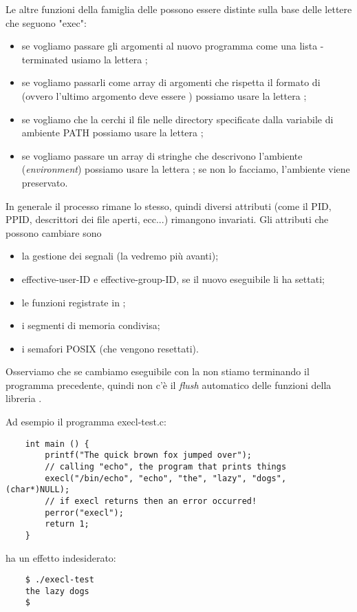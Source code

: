 Le altre funzioni della famiglia delle  possono essere distinte sulla base delle lettere che seguono "exec":
\begin{itemize}
    \item se vogliamo passare gli argomenti al nuovo programma come una lista -terminated usiamo la lettera ;
    \item se vogliamo passarli come array di argomenti che rispetta il formato di  (ovvero l'ultimo argomento deve essere ) possiamo usare la lettera ;
    \item se vogliamo che la  cerchi il file nelle directory specificate dalla variabile di ambiente \textsf{PATH} possiamo usare la lettera ;
    \item se vogliamo passare un array di stringhe che descrivono l'ambiente (\emph{environment}) possiamo usare la lettera ; se non lo facciamo, l'ambiente viene preservato.
\end{itemize}

In generale il processo rimane lo stesso, quindi diversi attributi (come il \textsf{PID}, \textsf{PPID}, descrittori dei file aperti, ecc...) rimangono invariati. Gli attributi che possono cambiare sono \begin{itemize}
    \item la gestione dei segnali (la vedremo più avanti);
    \item effective-user-ID e effective-group-ID, se il nuovo eseguibile li ha settati;
    \item le funzioni registrate in ;
    \item i segmenti di memoria condivisa;
    \item i semafori POSIX (che vengono resettati).
\end{itemize}

Osserviamo che se cambiamo eseguibile con la  non stiamo terminando il programma precedente, quindi non c'è il \emph{flush} automatico delle funzioni della libreria . 

Ad esempio il programma \textsf{execl-test.c}:
\begin{verbatim}
    int main () {
        printf("The quick brown fox jumped over");
        // calling "echo", the program that prints things
        execl("/bin/echo", "echo", "the", "lazy", "dogs", (char*)NULL); 
        // if execl returns then an error occurred!
        perror("execl");
        return 1;
    }
\end{verbatim}
ha un effetto indesiderato:
\begin{verbatim}
    $ ./execl-test
    the lazy dogs
    $ 
\end{verbatim}

